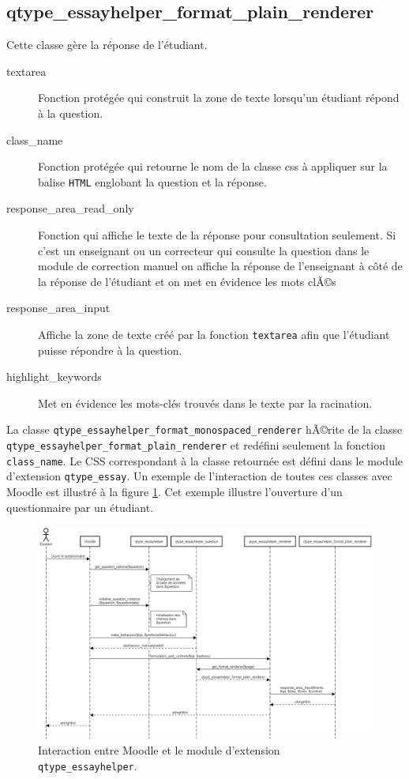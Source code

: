 \subsection*{qtype\_essayhelper\_format\_plain\_renderer}
Cette classe g\`ere la r\'eponse de l'\'etudiant.
\begin{description}
  \item[textarea] Fonction prot\'eg\'ee qui construit la zone de texte lorsqu'un \'etudiant r\'epond \`a la question.
  \item[class\_name] Fonction prot\'eg\'ee qui retourne le nom de la classe css \`a appliquer sur la balise \texttt{HTML} englobant la question et la r\'eponse.
  \item[response\_area\_read\_only] Fonction qui affiche le texte de la r\'eponse pour consultation seulement. Si c'est un enseignant ou un correcteur qui consulte la question dans le module de correction manuel on affiche la r\'eponse de l'enseignant \`a c\^ot\'e de la r\'eponse de l'\'etudiant et on met en \'evidence les mots clÃ©s
  \item[response\_area\_input] Affiche la zone de texte cr\'e\'e par la fonction \texttt{textarea} afin que l'\'etudiant puisse r\'epondre \`a la question.
  \item[highlight\_keywords] Met en \'evidence les mots-cl\'es trouv\'es dans le texte par la racination.
\end{description}
La classe \texttt{qtype\_essayhelper\_format\_monospaced\_renderer} hÃ©rite de la classe \texttt{qtype\_essayhelper\_format\_plain\_renderer} et red\'efini seulement la fonction \texttt{class\_name}.
Le CSS correspondant \`a la classe retourn\'ee est d\'efini dans le module d'extension \texttt{qtype\_essay}.
Un exemple de l'interaction de toutes ces classes avec Moodle est illustr\'e \`a la figure \ref{dev-diagramme}.
Cet exemple illustre l'ouverture d'un questionnaire par un \'etudiant.
\begin{landscape}
\begin{figure}[h!]
  \includegraphics[scale=0.4]{images/diagramme-flux.png}
  \caption{Interaction entre Moodle et le module d'extension \texttt{qtype\_essayhelper}.}
  \label{dev-diagramme}
\end{figure}
\end{landscape}
